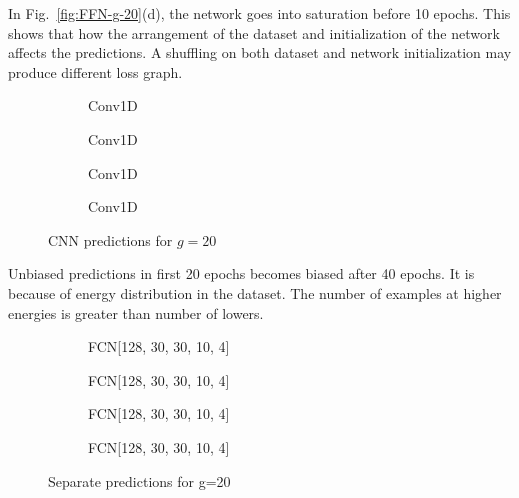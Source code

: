 \documentclass[a4paper,times,12pt]{article}
\begin{document}
In Fig.~\ref{fig:FFN-g-20}(d), the network goes into saturation before 10 epochs. This shows that how the arrangement of the dataset and initialization of the network affects the predictions. A shuffling  on both dataset and network initialization may produce different loss graph. 

\begin{figure}[H]
    \centering
    \begin{subfigure}[t]{0.45\textwidth}
		\centering
        
        \caption{Conv1D}
		\label{fig:a}
    \end{subfigure}
    \begin{subfigure}[t]{0.45\textwidth}
		\centering
        
        \caption{Conv1D}
		\label{fig:b}
    \end{subfigure}    
    \begin{subfigure}[t]{0.45\textwidth}
        \centering
        
        \caption{Conv1D}
		\label{fig:c}
    \end{subfigure}
    \begin{subfigure}[t]{0.45\textwidth}
        \centering
        
        \caption{Conv1D}
		\label{fig:d}
    \end{subfigure}
	\caption{CNN predictions for $g = 20$}
\label{fig:CNN-g-20}
\end{figure}

Unbiased predictions in first 20 epochs becomes biased after 40 epochs. It is because of energy distribution in the dataset. The number of examples at higher energies is greater than number of lowers. 

\begin{figure}[H]
    \centering
    \begin{subfigure}[t]{0.45\textwidth}
		\centering
        
        \caption{FCN[128, 30, 30, 10, 4]}
		\label{fig:a}
    \end{subfigure}
    \begin{subfigure}[t]{0.45\textwidth}
		\centering
        
        \caption{FCN[128, 30, 30, 10, 4]}
		\label{fig:b}
    \end{subfigure}    
    \begin{subfigure}[t]{0.45\textwidth}
        \centering
        
        \caption{FCN[128, 30, 30, 10, 4]}
		\label{fig:c}
    \end{subfigure}
    \begin{subfigure}[t]{0.45\textwidth}
        \centering
        
        \caption{FCN[128, 30, 30, 10, 4]}
		\label{fig:c}
    \end{subfigure}
	\caption{Separate predictions for g=20}
\label{fig:FFN-g-20-S}
\end{figure}
\end{document}
